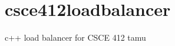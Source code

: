 \chapter{csce412loadbalancer}
\hypertarget{md__r_e_a_d_m_e}{}\label{md__r_e_a_d_m_e}
\label{md__r_e_a_d_m_e_autotoc_md0}%
%
c++ load balancer for CSCE 412 tamu 